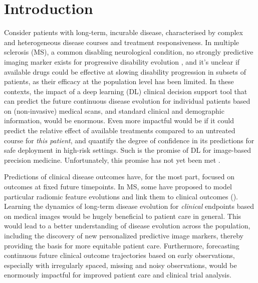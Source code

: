 \documentclass[runningheads]{llncs}
\begin{document}
\section{Introduction}
\label{sec:intro}
Consider patients with long-term, incurable disease, characterised by complex and heterogeneous disease courses and treatment responsiveness.  In multiple sclerosis (MS), a common disabling neurological condition, no strongly predictive imaging marker exists for progressive disability evolution \cite{MSheterogeneity}, and it's unclear if available drugs could be effective at slowing disability progression in subsets of patients, as their efficacy at the population level has been limited. In these contexts, the impact of a deep learning (DL) clinical decision support tool that can predict the future continuous disease evolution for individual patients based on (non-invasive) medical scans, and standard clinical and demographic information, would be enormous. Even more impactful would be if it could predict the relative effect of available treatments compared to an untreated course for \textit{this patient}, and quantify the degree of confidence in its predictions for safe deployment in high-risk settings. Such is the promise of DL for image-based precision medicine. Unfortunately, this promise has not yet been met \cite{AIMSsurvey}.

Predictions of clinical disease outcomes have, for the most part, focused on outcomes at fixed future timepoints\cite{tousignant2019,FANGCovid,litjens2017survey}. In MS, some have proposed to model particular radiomic feature evolutions and link them to clinical outcomes (\cite{pontillo2022,eshaghi2021}). Learning the dynamics of long-term disease evolution for \textit{clinical} endpoints based on medical images would be hugely beneficial to patient care in general. This would lead to a better understanding of disease evolution across the population, including the discovery of new personalized predictive image markers, thereby providing the basis for more equitable patient care. Furthermore, forecasting continuous future clinical outcome trajectories based on early observations, especially with irregularly spaced, missing and noisy observations, would be enormously impactful for improved patient care and clinical trial analysis.
 
\end{document}
